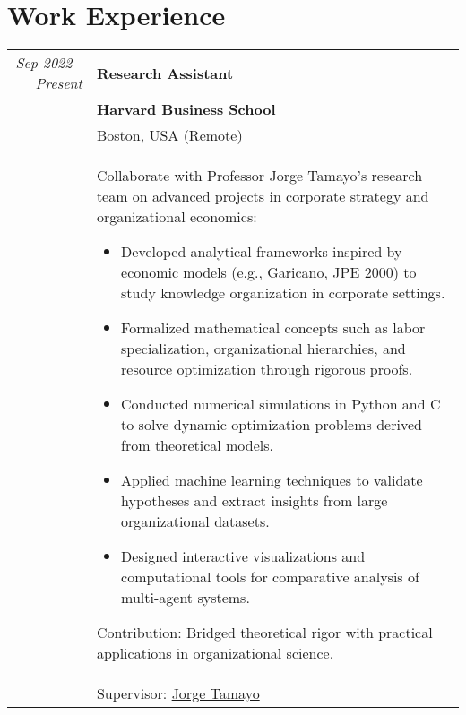 \documentclass[a4paper,10pt]{article} %
\begin{document}
\section{Work Experience}
\begin{tabular}{r|p{11cm}}
\emph{Sep 2022 - Present} & \textbf{Research Assistant} \\
& \textbf{Harvard Business School} \\
& Boston, USA (Remote) \\
& \footnotesize{
Collaborate with Professor Jorge Tamayo's research team on advanced projects in corporate strategy and organizational economics:
\begin{itemize}
    \item Developed analytical frameworks inspired by economic models (e.g., Garicano, JPE 2000) to study knowledge organization in corporate settings.
    \item Formalized mathematical concepts such as labor specialization, organizational hierarchies, and resource optimization through rigorous proofs.
    \item Conducted numerical simulations in Python and C to solve dynamic optimization problems derived from theoretical models.
    \item Applied machine learning techniques to validate hypotheses and extract insights from large organizational datasets.
    \item Designed interactive visualizations and computational tools for comparative analysis of multi-agent systems.
\end{itemize}
Contribution: Bridged theoretical rigor with practical applications in organizational science.
} \\
& Supervisor: \href{mailto:jtamayo@hbs.edu}{Jorge Tamayo} \\

    

\end{tabular}
\end{document}
